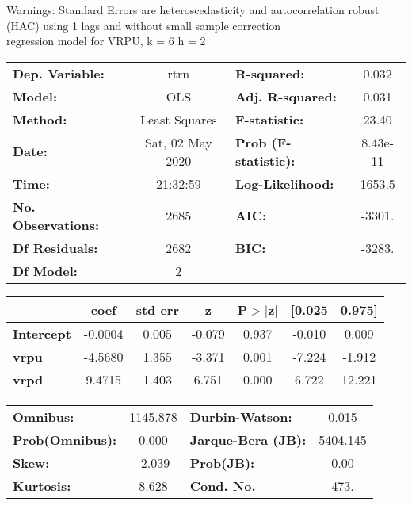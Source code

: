 Warnings: \newline
 [1] Standard Errors are heteroscedasticity and autocorrelation robust (HAC) using 1 lags and without small sample correction\\ 

regression model for VRPU, k = 6 h = 2\begin{center}
\begin{tabular}{lclc}
\toprule
\textbf{Dep. Variable:}    &       rtrn       & \textbf{  R-squared:         } &     0.032   \\
\textbf{Model:}            &       OLS        & \textbf{  Adj. R-squared:    } &     0.031   \\
\textbf{Method:}           &  Least Squares   & \textbf{  F-statistic:       } &     23.40   \\
\textbf{Date:}             & Sat, 02 May 2020 & \textbf{  Prob (F-statistic):} &  8.43e-11   \\
\textbf{Time:}             &     21:32:59     & \textbf{  Log-Likelihood:    } &    1653.5   \\
\textbf{No. Observations:} &        2685      & \textbf{  AIC:               } &    -3301.   \\
\textbf{Df Residuals:}     &        2682      & \textbf{  BIC:               } &    -3283.   \\
\textbf{Df Model:}         &           2      & \textbf{                     } &             \\
\bottomrule
\end{tabular}
\begin{tabular}{lcccccc}
                   & \textbf{coef} & \textbf{std err} & \textbf{z} & \textbf{P$> |$z$|$} & \textbf{[0.025} & \textbf{0.975]}  \\
\midrule
\textbf{Intercept} &      -0.0004  &        0.005     &    -0.079  &         0.937        &       -0.010    &        0.009     \\
\textbf{vrpu}      &      -4.5680  &        1.355     &    -3.371  &         0.001        &       -7.224    &       -1.912     \\
\textbf{vrpd}      &       9.4715  &        1.403     &     6.751  &         0.000        &        6.722    &       12.221     \\
\bottomrule
\end{tabular}
\begin{tabular}{lclc}
\textbf{Omnibus:}       & 1145.878 & \textbf{  Durbin-Watson:     } &    0.015  \\
\textbf{Prob(Omnibus):} &   0.000  & \textbf{  Jarque-Bera (JB):  } & 5404.145  \\
\textbf{Skew:}          &  -2.039  & \textbf{  Prob(JB):          } &     0.00  \\
\textbf{Kurtosis:}      &   8.628  & \textbf{  Cond. No.          } &     473.  \\
\bottomrule
\end{tabular}
\end{center}


